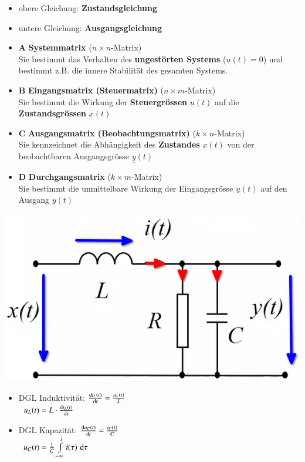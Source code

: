 \begin{itemize}
    \item obere Gleichung: \textbf{Zustandsgleichung}
    \item untere Gleichung: \textbf{Ausgangsgleichung}
    \item $\bm{A}$ \textbf{Systemmatrix} ($n \times n$-Matrix) \\
        Sie bestimmt das Verhalten des \textbf{ungestörten Systems} ($\underline{u}(t) = 0$)
        und bestimmt z.B. die innere Stabilität des gesamten Systems.
    \item $\bm{B}$ \textbf{Eingangsmatrix (Steuermatrix)} ($n \times m$-Matrix) \\
        Sie bestimmt die Wirkung der \textbf{Steuergrössen} $\underline{u}(t)$ auf die \textbf{Zustandsgrössen} $\underline{x}(t)$
    \item $\bm{C}$ \textbf{Ausgangsmatrix (Beobachtungsmatrix)} ($k \times n$-Matrix) \\
        Sie kennzeichnet die Abhängigkeit des \textbf{Zustandes} $\underline{x}(t)$ von der beobachtbaren Ausgangsgrösse $\underline{y}(t)$
    \item $\bm{D}$ \textbf{Durchgangsmatrix} ($k \times m$-Matrix) \\
        Sie bestimmt die unmittelbare Wirkung der Eingangsgrösse $\underline{u}(t)$ auf den Ausgang $\underline{y}(t)$
\end{itemize}



\begin{minipage}[c]{0.48\columnwidth}
    \includegraphics[width=0.9\columnwidth]{images/beispiel_zrd_aus_schaltung.png}
\end{minipage}
\hfill
\begin{minipage}[c]{0.48\columnwidth}
    \begin{itemize}
        \item DGL Induktivität: $\frac{\mathop{} \! \mathrm{d} i_L(t)}{\mathop{} \! \mathrm{d} t} = \frac{u_L(t)}{L}$ \\
            \textrightarrow\ $u_L(t) = L \cdot \frac{\mathop{} \! \mathrm{d} i_L(t)}{\mathop{} \! \mathrm{d} t}$
        \item DGL Kapazität: $\frac{\mathop{} \! \mathrm{d} u_C(t)}{\mathop{} \! \mathrm{d} t} = \frac{i_C(t)}{C}$ \\
        \textrightarrow\ $u_C(t) = \frac{1}{C} \int\limits_{- \infty}^t i(\tau) \, \mathop{} \! \mathrm{d} \tau$
    \end{itemize}
\end{minipage}


